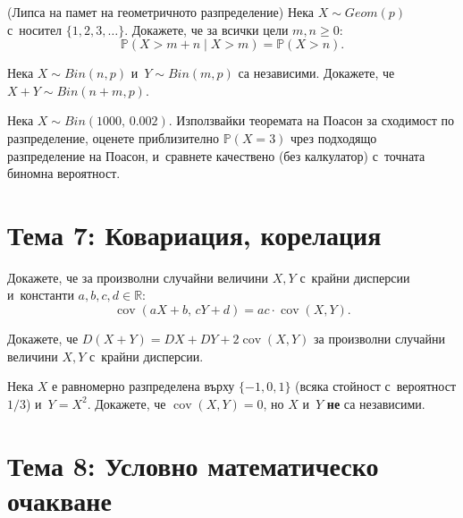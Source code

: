 \begin{probbox}[Задача 6.1]
(Липса на памет на геометричното разпределение) Нека $X\sim Geom(p)$
с~носител $\{1,2,3,\dots\}$. Докажете, че за всички цели $m,n\ge0$:
\[
  \mathbb P(X>m+n \mid X>m) = \mathbb P(X>n).
\]
\end{probbox}

\begin{probbox}[Задача 6.2]
Нека $X\sim Bin(n,p)$ и~$Y\sim Bin(m,p)$ са независими. Докажете, че
$X+Y\sim Bin(n+m,p)$.
\end{probbox}

\begin{probbox}[Задача 6.3]
Нека $X\sim Bin(1000,\,0.002)$. Използвайки теоремата на Поасон за
сходимост по разпределение, оценете приблизително $\mathbb P(X=3)$
чрез подходящо разпределение на Поасон, и~сравнете качествено
(без калкулатор) с~точната биномна вероятност.
\end{probbox}

\section*{Тема 7: Ковариация, корелация}

\begin{probbox}[Задача 7.1]
Докажете, че за произволни случайни величини $X,Y$ с~крайни
дисперсии и~константи $a,b,c,d\in\mathbb R$:
\[
  \operatorname{cov}(aX+b,\,cY+d) = ac\cdot\operatorname{cov}(X,Y).
\]
\end{probbox}

\begin{probbox}[Задача 7.2]
Докажете, че $D(X+Y) = DX+DY+2\operatorname{cov}(X,Y)$ за произволни
случайни величини $X,Y$ с~крайни дисперсии.
\end{probbox}

\begin{probbox}[Задача 7.3]
Нека $X$ е равномерно разпределена върху $\{-1,0,1\}$ (всяка стойност
с~вероятност $1/3$) и~$Y=X^2$. Докажете, че $\operatorname{cov}(X,Y)=0$,
но $X$ и~$Y$ \textbf{не} са независими.
\end{probbox}

\section*{Тема 8: Условно математическо очакване}

